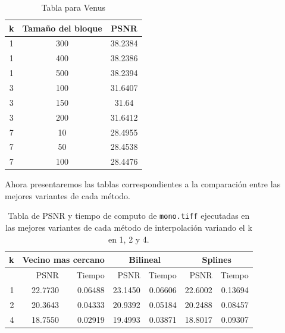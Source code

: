 \documentclass[a4paper]{article}
\newcounter{col}
\begin{document}
\begin{table}[h]
\centering
\label{my-label}
\begin{tabular}{|c|c|c|}
\hline
k & Tamaño del bloque & PSNR    \\ \hline
1 & 300               & 38.2384 \\ \hline
1 & 400               & 38.2386 \\ \hline
1 & 500               & 38.2394 \\ \hline
3 & 100               & 31.6407 \\ \hline
3 & 150               & 31.64   \\ \hline
3 & 200               & 31.6412 \\ \hline
7 & 10                & 28.4955 \\ \hline
7 & 50                & 28.4538 \\ \hline
7 & 100               & 28.4476 \\ \hline
\end{tabular}
\caption{Tabla para Venus}
\end{table}

Ahora presentaremos las tablas correspondientes a la comparación entre las mejores variantes de cada método.
\begin{table}[H]
\centering
\begin{tabular}{|r|r|r|r|r|r|r|}
\hline
\multicolumn{1}{|c|}{k} & \multicolumn{2}{|c|}{Vecino mas cercano} & \multicolumn{2}{|c|}{Bilineal} & \multicolumn{2}{|c|}{Splines} \\ \hline
  & PSNR & Tiempo & PSNR & Tiempo & PSNR & Tiempo \\ \hline
1 & 22.7730 & 0.06488 & 23.1450 & 0.06606 &  22.6002 & 0.13694 \\ \hline
2 & 20.3643 & 0.04333 & 20.9392 & 0.05184 &  20.2488 & 0.08457 \\ \hline
4 & 18.7550 & 0.02919 & 19.4993 & 0.03871 &  18.8017 & 0.09307 \\ \hline
\end{tabular}
\caption{Tabla de PSNR y tiempo de computo de \texttt{mono.tiff} ejecutadas en las mejores variantes de cada m\'etodo de interpolaci\'on variando el k en 1, 2 y 4.}
\label{}
\end{table}
\end{document}
